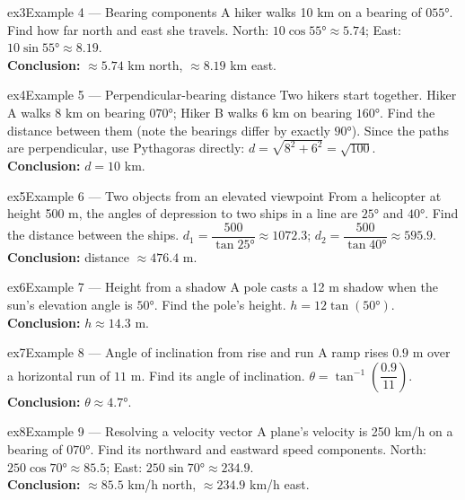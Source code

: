 \documentclass[11pt]{article}
\begin{document}
\begin{example}{ex3}{Example 4 --- Bearing components}
A hiker walks 10 km on a bearing of $055°$. Find how far north and east she travels.\soln
North: $10\cos55°\approx5.74$; East: $10\sin55°\approx8.19$.\\[3pt]\textbf{Conclusion:} $\approx5.74$ km north, $\approx8.19$ km east.
\end{example}

\begin{example}{ex4}{Example 5 --- Perpendicular-bearing distance}
Two hikers start together. Hiker A walks 8 km on bearing $070°$; Hiker B walks 6 km on bearing $160°$. Find the distance between them (note the bearings differ by exactly $90°$).\soln
Since the paths are perpendicular, use Pythagoras directly: $d=\sqrt{8^2+6^2}=\sqrt{100}$.\\[3pt]\textbf{Conclusion:} $d=10$ km.
\end{example}

\begin{example}{ex5}{Example 6 --- Two objects from an elevated viewpoint}
From a helicopter at height 500 m, the angles of depression to two ships in a line are $25°$ and $40°$. Find the distance between the ships.\soln
$d_1=\dfrac{500}{\tan25°}\approx1072.3$; $d_2=\dfrac{500}{\tan40°}\approx595.9$.\\[3pt]\textbf{Conclusion:} distance $\approx476.4$ m.
\end{example}

\begin{example}{ex6}{Example 7 --- Height from a shadow}
A pole casts a 12 m shadow when the sun's elevation angle is $50°$. Find the pole's height.\soln
$h=12\tan(50°)$.\\[3pt]\textbf{Conclusion:} $h\approx14.3$ m.
\end{example}

\begin{example}{ex7}{Example 8 --- Angle of inclination from rise and run}
A ramp rises $0.9$ m over a horizontal run of $11$ m. Find its angle of inclination.\soln
$\theta=\tan^{-1}\!\left(\dfrac{0.9}{11}\right)$.\\[3pt]\textbf{Conclusion:} $\theta\approx4.7°$.
\end{example}

\begin{example}{ex8}{Example 9 --- Resolving a velocity vector}
A plane's velocity is 250 km/h on a bearing of $070°$. Find its northward and eastward speed components.\soln
North: $250\cos70°\approx85.5$; East: $250\sin70°\approx234.9$.\\[3pt]\textbf{Conclusion:} $\approx85.5$ km/h north, $\approx234.9$ km/h east.
\end{example}
\end{document}
